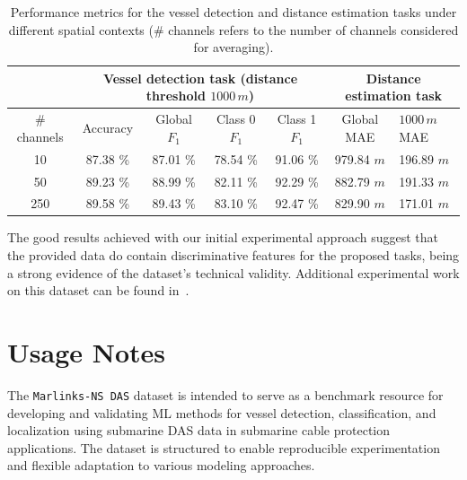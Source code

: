 \documentclass[11pt]{article}
\begin{document}
\begin{table}[htbp]
  \caption{Performance metrics for the vessel detection and distance estimation tasks under different spatial contexts (\textrm{\# channels} refers to the number of channels considered for averaging).}
  \label{tab:performance}
  \begin{tabular}{ccccccl}
& \multicolumn{4}{c}{Vessel detection task (distance threshold $1000\,m$)} & \multicolumn{2}{c}{Distance estimation task} \\ \hline
    \# channels & Accuracy     & Global $F_1$     & Class 0 $F_1$     & Class 1 $F_1$     & Global MAE           & $1000\,m$ MAE         \\ \hline
    10          &87.38 \%              &87.01 \%                   &78.54 \%                    &91.06 \%                    &979.84 $m$                      &196.89 $m$                       \\ \hline
    50          &89.23 \%               &88.99 \%                   &82.11 \%                    &92.29 \%                    &882.79 $m$                      &191.33 $m$                       \\ \hline
    250         &89.58 \%               &89.43 \%                   &83.10 \%                    &92.47 \%                    &829.90 $m$                      &171.01 $m$                       \\ \hline
  \end{tabular}
\end{table}

The good results achieved with our initial experimental approach suggest that the provided data do contain discriminative features for the proposed tasks, being a strong evidence of the dataset's technical validity. Additional experimental work on this dataset can be found in~\cite{RamirezTorres2026VesselDAS}.


\section{Usage Notes}
\label{sec:usage notes}

The \texttt{Marlinks-NS DAS} dataset is intended to serve as a benchmark resource for developing and validating ML methods for vessel detection, classification, and localization using submarine DAS data in submarine cable protection applications. The dataset is structured to enable reproducible experimentation and flexible adaptation to various modeling approaches.
\end{document}
